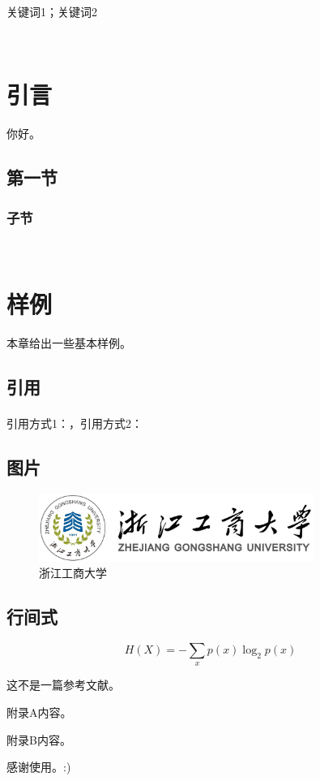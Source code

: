 \documentclass{zjgsuthesis}
\date{二〇二四\ 年\ 1月\ 1日}
\begin{document}
\makecover  %


\initdoc

{关键词1；关键词2}





\directory
\startdoc


\clearpage
~
\vspace{-7mm}
\section{引言}
你好。


\subsection{第一节}
\subsubsection{子节}


\clearpage
~
\vspace{-7mm}
\section{样例}
本章给出一些基本样例。


\subsection{引用}
引用方式1：\cite{sample}，引用方式2：\textsuperscript{\cite{sample}}


\subsection{图片}
\begin{figure}[htbp]
	\centering
	\includegraphics[width=0.8\textwidth]{figure/zjgsu.png}
	\caption{浙江工商大学}
	\label{zjgsu}
\end{figure}


\subsection{行间式}
\begin{equation}
	H(X)=-\sum_{x}p(x)\log_2p(x)
\end{equation}

\clearpage
\begin{thebibliography}{30}
	\setref
	 这不是一篇参考文献。
\end{thebibliography}



\initappandices
{}
附录A内容。

附录B内容。

\acknowledgment
感谢使用。:)
\end{document}
